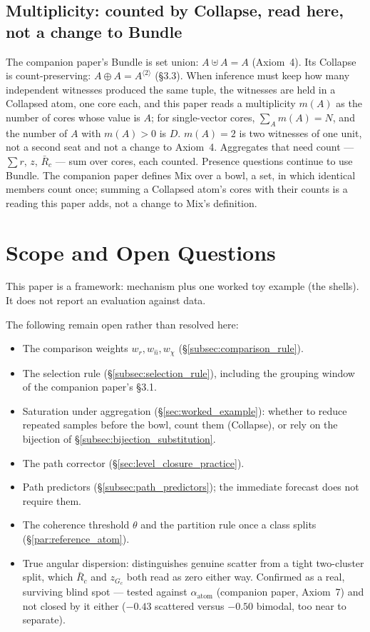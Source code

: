 \documentclass[12pt, a4paper]{article}
\begin{document}
\subsection{Multiplicity: counted by Collapse, read here, not a change to Bundle}
\label{subsec:multiplicity_reading}
The companion paper's Bundle is set union: $A\uplus A=A$ (Axiom~4). Its
Collapse is count-preserving: $A\oplus A=A^{\langle 2\rangle}$
(\S3.3). When inference must keep how many independent witnesses
produced the same tuple, the witnesses are held in a Collapsed atom,
one core each, and this paper reads a multiplicity $m(A)$ as the
number of cores whose value is $A$; for single-vector cores,
$\sum_A m(A)=N$, and the number of $A$ with $m(A)>0$ is $D$.
$m(A)=2$ is two witnesses of one unit, not a second seat and not a
change to Axiom~4. Aggregates that need count --- $\sum r$, $z$,
$\bar R_c$ --- sum over cores, each counted. Presence questions
continue to use Bundle. The companion paper defines Mix over a bowl,
a set, in which identical members count once; summing a Collapsed
atom's cores with their counts is a reading this paper adds, not a
change to Mix's definition.

\section{Scope and Open Questions}
\label{sec:scope}

This paper is a framework: mechanism plus one worked toy example
(the shells). It does not report an evaluation against data.

The following remain open rather than resolved here:

\begin{itemize}
\item The comparison weights $w_r,w_{\hat n},w_\chi$
      (\S\ref{subsec:comparison_rule}).
\item The selection rule (\S\ref{subsec:selection_rule}), including the grouping window of the companion paper's \S3.1.
\item Saturation under aggregation (\S\ref{sec:worked_example}):
      whether to reduce repeated samples before the bowl, count them (Collapse), or rely on the bijection of \S\ref{subsec:bijection_substitution}.
\item The path corrector (\S\ref{sec:level_closure_practice}).
\item Path predictors (\S\ref{subsec:path_predictors}); the immediate
      forecast does not require them.
\item The coherence threshold $\theta$ and the partition rule once a
      class splits (\S\ref{par:reference_atom}).
\item True angular dispersion: distinguishes genuine scatter from a
      tight two-cluster split, which $\bar R_c$ and $z_{G_c}$ both
      read as zero either way. Confirmed as a real, surviving blind
      spot --- tested against $\alpha_{\text{atom}}$ (companion
      paper, Axiom~7) and not closed by it either ($-0.43$ scattered
      versus $-0.50$ bimodal, too near to separate).
\end{itemize}
\end{document}
